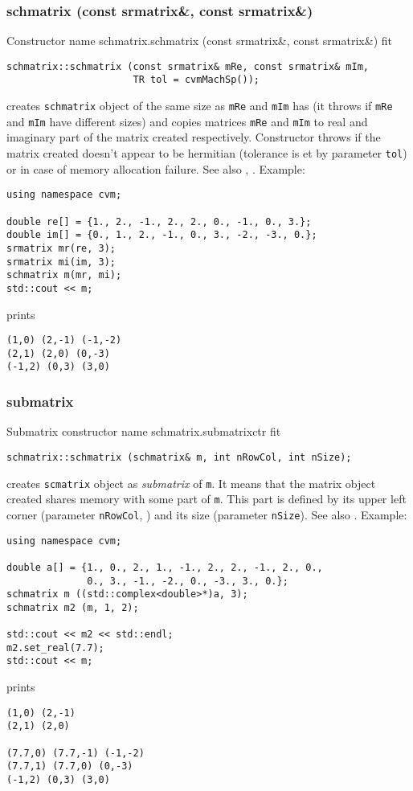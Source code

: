 \subsubsection{schmatrix (const srmatrix\&, const srmatrix\&)}
Constructor%
\pdfdest name {schmatrix.schmatrix (const srmatrix&, const srmatrix&)} fit
\begin{verbatim}
schmatrix::schmatrix (const srmatrix& mRe, const srmatrix& mIm,
                      TR tol = cvmMachSp());
\end{verbatim}
creates  \verb"schmatrix" object
of the same size as \verb"mRe" and \verb"mIm" has
(it throws 
if \verb"mRe" and
\verb"mIm" have different sizes)
and copies matrices \verb"mRe" and \verb"mIm"
to  real and imaginary part of the matrix created respectively.
Constructor throws  
if the matrix created doesn't appear to be hermitian (tolerance is et by parameter \verb'tol')
or in case of memory allocation failure.
See also , .
Example:
\begin{Verbatim}
using namespace cvm;

double re[] = {1., 2., -1., 2., 2., 0., -1., 0., 3.};
double im[] = {0., 1., 2., -1., 0., 3., -2., -3., 0.};
srmatrix mr(re, 3);
srmatrix mi(im, 3);
schmatrix m(mr, mi);
std::cout << m;
\end{Verbatim}
prints
\begin{Verbatim}
(1,0) (2,-1) (-1,-2)
(2,1) (2,0) (0,-3)
(-1,2) (0,3) (3,0)
\end{Verbatim}
\newpage



\subsubsection{submatrix}
Submatrix constructor%
\pdfdest name {schmatrix.submatrixctr} fit
\begin{verbatim}
schmatrix::schmatrix (schmatrix& m, int nRowCol, int nSize);
\end{verbatim}
creates  \verb"scmatrix" object as  \emph{submatrix} of \verb"m".
It means that the matrix object created shares  memory with some part
of \verb"m". This part is defined by its upper left corner (parameter 
\verb"nRowCol", \Based)
and its size (parameter \verb"nSize").
See also .
Example:
\begin{Verbatim}
using namespace cvm;

double a[] = {1., 0., 2., 1., -1., 2., 2., -1., 2., 0.,
              0., 3., -1., -2., 0., -3., 3., 0.};
schmatrix m ((std::complex<double>*)a, 3);
schmatrix m2 (m, 1, 2);

std::cout << m2 << std::endl;
m2.set_real(7.7);
std::cout << m;
\end{Verbatim}
prints
\begin{Verbatim}
(1,0) (2,-1)
(2,1) (2,0)

(7.7,0) (7.7,-1) (-1,-2)
(7.7,1) (7.7,0) (0,-3)
(-1,2) (0,3) (3,0)
\end{Verbatim}
\newpage




